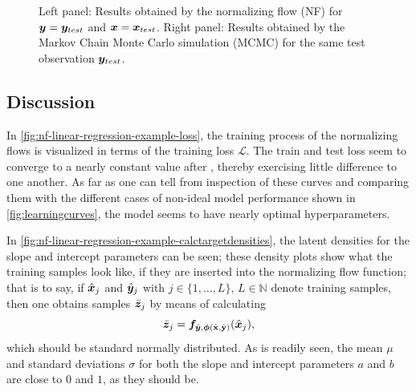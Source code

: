 \documentclass[a4paper,12pt]{report}
\def\lk#1{{\color{black}{#1}}}
\begin{document}
\begin{figure}[h!]
\begin{subfigure}[t]{0.49\textwidth}
	\end{subfigure}
\cprotect\caption{Left panel: Results obtained by the normalizing flow (NF) for $\bm{y} = \bm{y}_{test}$ and $\bm{x} = \bm{x}_{test}$. Right panel: Results obtained by the Markov Chain Monte Carlo simulation (MCMC) for the same test observation $\bm{y}_{test}$.}
\label{fig:nf-linear-regression-example-performance}
\end{figure}

\subsection{Discussion}
In \cref{fig:nf-linear-regression-example-loss}, the training process of the normalizing flows is visualized in terms of the training loss $\mathcal{L}$. The train and test loss seem to converge to a nearly constant value after \lk{about six epochs}, thereby exercising little difference to one another. As far as one can tell from inspection of these curves and comparing them with the different cases of non-ideal model performance shown in \cref{fig:learningcurves}, the model seems to have nearly optimal hyperparameters.

In \cref{fig:nf-linear-regression-example-calctargetdensities}, the latent densities for the slope and intercept parameters can be seen; these density plots show what the training samples look like, if they are inserted into the normalizing flow function; that is to say, if $\hat{\bm{x}}_{j}$ and $\hat{\bm{y}}_j$ with $j \in \{1,\dots,L\},\,L \in \mathbb{N}$ denote training samples, then one obtains samples $\bar{\bm{z}}_{j}$ by means of calculating \begin{equation}
\bar{\bm{z}}_{j} = \bm{f}_{\hat{\bm{y}},\bm{\phi}(\hat{\boldsymbol{\mathbf{x}}},\hat{\boldsymbol{\mathbf{y}}})}(\hat{\bm{x}}_{j}),
\end{equation} which should be standard normally distributed. As is readily seen, the mean $\mu$ and standard deviations $\sigma$ for both the slope and intercept parameters $a$ and $b$ are close to $0$ and $1$, as they should be.
\end{document}
